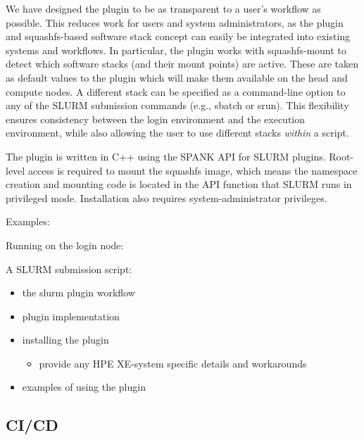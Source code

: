 We have designed the plugin to be as transparent to a user's workflow as possible.
This reduces work for users and system administrators, as the plugin and squashfs-based software stack concept can easily be integrated into existing systems and workflows.
In particular, the plugin works with squashfs-mount to detect which software stacks (and their mount points) are active.
These are taken as default values to the plugin which will make them available on the head and compute nodes.
A different stack can be specified as a command-line option to any of the SLURM submission commands (e.g., sbatch or srun).
This flexibility ensures consistency between the login environment and the execution environment, while also allowing the user to use different stacks \emph{within} a script.

The plugin is written in C++ using the SPANK API for SLURM plugins.
Root-level access is required to mount the squashfs image, which means the namespace creation and mounting code is located in the API function that SLURM runs in privileged mode.
Installation also requires system-administrator privileges.

Examples:

Running on the login node:


A SLURM submission script:


\begin{itemize}
    \item the slurm plugin workflow
    \item plugin implementation
    \item installing the plugin
    \begin{itemize}
        \item provide any HPE XE-system specific details and workarounds
    \end{itemize}
    \item examples of using the plugin
\end{itemize}

\subsection{CI/CD}


